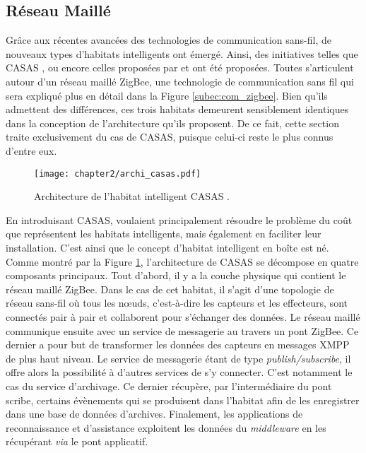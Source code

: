 \subsection{Réseau Maillé}

Grâce aux récentes avancées des technologies de communication sans-fil, de nouveaux types d'habitats intelligents ont émergé. Ainsi, des initiatives telles que CASAS \citep{Cook2013}, ou encore celles proposées par \cite{Zhihua2016} et \cite{Zhenyu2011} ont été proposées. Toutes s'articulent autour d'un réseau maillé ZigBee, une technologie de communication sans fil qui sera expliqué plus en détail dans la Figure \ref{subec:com_zigbee}. Bien qu'ils admettent des différences, ces trois habitats demeurent sensiblement identiques dans la conception de l'architecture qu'ils proposent. De ce fait, cette section traite exclusivement du cas de CASAS, puisque celui-ci reste le plus connus d'entre eux.

\begin{figure}[H]
	\centering
	\texttt{[image: chapter2/archi\_casas.pdf]}
	\caption[Architecture de l'habitat intelligent CASAS.]{Architecture de l'habitat intelligent CASAS \citep{Cook2013}.}
	\label{fig:archi_casas}
\end{figure}

En introduisant CASAS, \cite{Cook2013} voulaient principalement résoudre le problème du coût que représentent les habitats intelligents, mais également en faciliter leur installation. C'est ainsi que le concept d'habitat intelligent en boîte est né. Comme montré par la Figure \ref{fig:archi_casas}, l'architecture de CASAS se décompose en quatre composants principaux. Tout d'abord, il y a la couche physique qui contient le réseau maillé ZigBee. Dans le cas de cet habitat, il s'agit d'une topologie de réseau sans-fil où tous les n\oe{}uds, c'est-à-dire les capteurs et les effecteurs, sont connectés pair à pair et collaborent pour s'échanger des données. Le réseau maillé communique ensuite avec un service de messagerie au travers un pont ZigBee. Ce dernier a pour but de transformer les données des capteurs en messages \ac{XMPP} de plus haut niveau. Le service de messagerie étant de type \textit{publish/subscribe}, il offre alors la possibilité à d'autres services de s'y connecter. C'est notamment le cas du service d'archivage. Ce dernier récupère, par l'intermédiaire du pont scribe, certains évènements qui se produisent dans l'habitat afin de les enregistrer dans une base de données d'archives. Finalement, les applications de reconnaissance et d'assistance exploitent les données du \textit{middleware} en les récupérant \textit{via} le pont applicatif.

